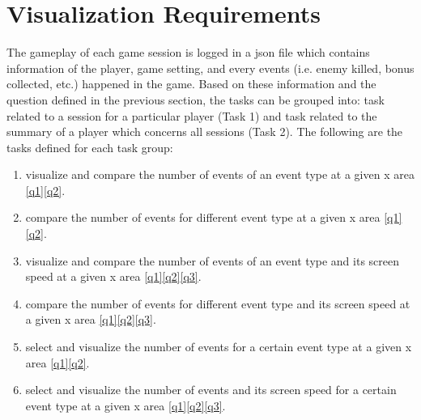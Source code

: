 \section{Visualization Requirements}

The gameplay of each game session is logged in a json file which contains information of the player, game setting, and every events (i.e. enemy killed, bonus collected, etc.) happened in the game. Based on these information and the question defined in the previous section, the tasks can be grouped into: task related to a session for a particular player (Task 1) and task related to the summary of a player which concerns all sessions (Task 2). The following are the tasks defined for each task group:
\newcommand{\task}[2]{$#1 #2$}
\begin{enumerate}[label=\textbf{(\task{T1.}{\arabic*})}]
\item \label{t11} visualize and compare the number of events of an event type at a given x area \ref{q1}\ref{q2}.
\item \label{t12} compare the number of events for different event type at a given x area  \ref{q1}\ref{q2}.
\item \label{t13} visualize and compare the number of events of an event type and its screen speed at a given x area \ref{q1}\ref{q2}\ref{q3}.
\item \label{t14} compare the number of events for different event type and its screen speed at a given x area \ref{q1}\ref{q2}\ref{q3}.
\item \label{t15} select and visualize the number of events for a certain event type at a given x area \ref{q1}\ref{q2}.
\item \label{t16} select and visualize the number of events and its screen speed for a certain event type at a given x area \ref{q1}\ref{q2}\ref{q3}.
\end{enumerate}

